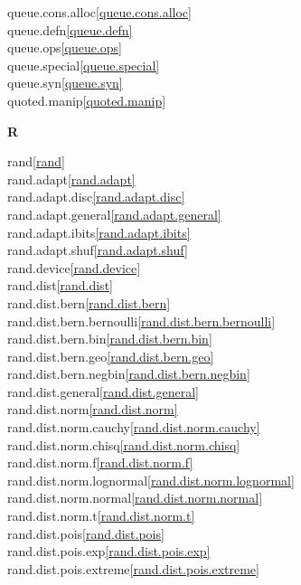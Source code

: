 \begin{multicols}{2}
queue.cons.alloc\quad\ref{queue.cons.alloc}\\
queue.defn\quad\ref{queue.defn}\\
queue.ops\quad\ref{queue.ops}\\
queue.special\quad\ref{queue.special}\\
queue.syn\quad\ref{queue.syn}\\
quoted.manip\quad\ref{quoted.manip}\\
\par \textbf{R}\par
rand\quad\ref{rand}\\
rand.adapt\quad\ref{rand.adapt}\\
rand.adapt.disc\quad\ref{rand.adapt.disc}\\
rand.adapt.general\quad\ref{rand.adapt.general}\\
rand.adapt.ibits\quad\ref{rand.adapt.ibits}\\
rand.adapt.shuf\quad\ref{rand.adapt.shuf}\\
rand.device\quad\ref{rand.device}\\
rand.dist\quad\ref{rand.dist}\\
rand.dist.bern\quad\ref{rand.dist.bern}\\
rand.dist.bern.bernoulli\quad\ref{rand.dist.bern.bernoulli}\\
rand.dist.bern.bin\quad\ref{rand.dist.bern.bin}\\
rand.dist.bern.geo\quad\ref{rand.dist.bern.geo}\\
rand.dist.bern.negbin\quad\ref{rand.dist.bern.negbin}\\
rand.dist.general\quad\ref{rand.dist.general}\\
rand.dist.norm\quad\ref{rand.dist.norm}\\
rand.dist.norm.cauchy\quad\ref{rand.dist.norm.cauchy}\\
rand.dist.norm.chisq\quad\ref{rand.dist.norm.chisq}\\
rand.dist.norm.f\quad\ref{rand.dist.norm.f}\\
rand.dist.norm.lognormal\quad\ref{rand.dist.norm.lognormal}\\
rand.dist.norm.normal\quad\ref{rand.dist.norm.normal}\\
rand.dist.norm.t\quad\ref{rand.dist.norm.t}\\
rand.dist.pois\quad\ref{rand.dist.pois}\\
rand.dist.pois.exp\quad\ref{rand.dist.pois.exp}\\
rand.dist.pois.extreme\quad\ref{rand.dist.pois.extreme}\\

\end{multicols}
